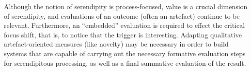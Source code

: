 %

Although the notion of serendipity is process-focused, value is a crucial dimension of serendipity, and evaluations of an outcome (often an artefact) continue to be relevant.  Furthermore, an ``embedded'' evaluation is required to effect the critical focus shift, that is, to notice that the trigger is interesting.    Adapting qualitative artefact-oriented measures (like novelty) may be necessary in order to build systems that are capable of carrying out the necessary formative evaluation steps for serendipitous processing, as well as a final summative evaluation of the result.  
